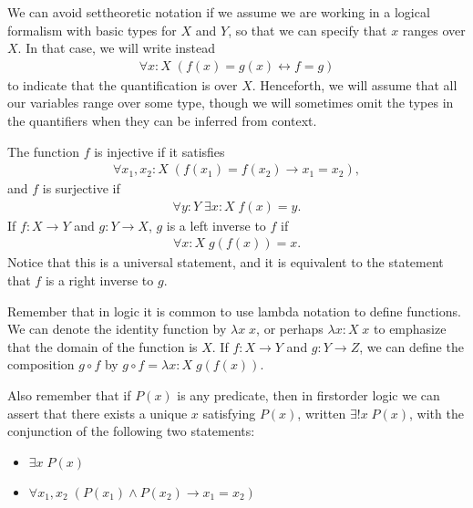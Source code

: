 \documentclass[letterpaper,10pt,english]{sphinxmanual}
\begin{document}
\sphinxAtStartPar
We can avoid set\sphinxhyphen{}theoretic notation if we assume we are working in a logical formalism with basic types for \(X\) and \(Y\), so that we can specify that \(x\) ranges over \(X\). In that case, we will write instead
\begin{equation*}
\begin{split}\forall x : X \; (f(x) = g(x) \leftrightarrow f = g)\end{split}
\end{equation*}
\sphinxAtStartPar
to indicate that the quantification is over \(X\). Henceforth, we will assume that all our variables range over some type, though we will sometimes omit the types in the quantifiers when they can be inferred from context.

\sphinxAtStartPar
The function \(f\) is injective if it satisfies
\begin{equation*}
\begin{split}\forall x_1, x_2 : X \; (f(x_1) = f(x_2) \to x_1 = x_2),\end{split}
\end{equation*}
\sphinxAtStartPar
and \(f\) is surjective if
\begin{equation*}
\begin{split}\forall y : Y \; \exists x : X \; f(x) = y.\end{split}
\end{equation*}
\sphinxAtStartPar
If \(f : X \to Y\) and \(g: Y \to X\), \(g\) is a left inverse to \(f\) if
\begin{equation*}
\begin{split}\forall x : X \; g(f(x)) = x.\end{split}
\end{equation*}
\sphinxAtStartPar
Notice that this is a universal statement, and it is equivalent to the statement that \(f\) is a right inverse to \(g\).

\sphinxAtStartPar
Remember that in logic it is common to use lambda notation to define functions. We can denote the identity function by \(\lambda x \; x\), or perhaps \(\lambda x : X \; x\) to emphasize that the domain of the function is \(X\). If \(f : X \to Y\) and \(g : Y \to Z\), we can define the composition \(g \circ f\) by \(g \circ f = \lambda x : X \; g(f(x))\).

\sphinxAtStartPar
Also remember that if \(P(x)\) is any predicate, then in first\sphinxhyphen{}order logic we can assert that there exists a unique \(x\) satisfying \(P(x)\), written \(\exists! x \; P(x)\), with the conjunction of the following two statements:
\begin{itemize}
\item {} 
\sphinxAtStartPar
\(\exists x \; P(x)\)

\item {} 
\sphinxAtStartPar
\(\forall x_1, x_2 \; (P(x_1) \wedge P(x_2) \to x_1 = x_2)\)

\end{itemize}
\end{document}
